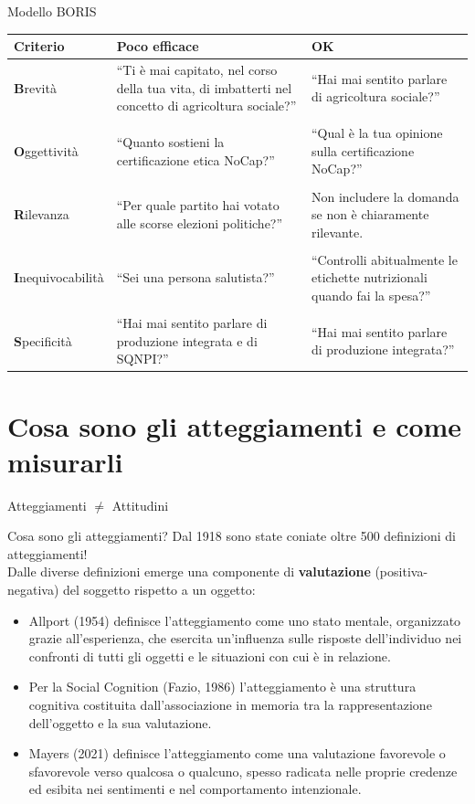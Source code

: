 \documentclass{beamer}
\begin{document}
\begin{frame}{Modello BORIS}
  \scriptsize
  \centering
  \begin{tabular}{lp{4cm}p{3.5cm}}
    \toprule
    \textbf{Criterio} & \textbf{Poco efficace} & \textbf{OK} \\
    \midrule
    \textbf{B}revità & “Ti è mai capitato, nel corso della tua vita, di imbatterti nel concetto di agricoltura sociale?” & “Hai mai sentito parlare di agricoltura sociale?” \\
    \\
    \textbf{O}ggettività & “Quanto sostieni la certificazione etica NoCap?” & “Qual è la tua opinione sulla certificazione NoCap?” \\
    \\
    \textbf{R}ilevanza & “Per quale partito hai votato alle scorse elezioni politiche?” & Non includere la domanda se non è chiaramente rilevante. \\
    \\
    \textbf{I}nequivocabilità & “Sei una persona salutista?” & “Controlli abitualmente le etichette nutrizionali quando fai la spesa?” \\
    \\
    \textbf{S}pecificità & “Hai mai sentito parlare di produzione integrata e di SQNPI?” & “Hai mai sentito parlare di produzione integrata?” \\
    \bottomrule
  \end{tabular}
\end{frame}

\section{Cosa sono gli atteggiamenti e come misurarli}
\begin{frame}{Atteggiamenti $\neq$ Attitudini}
    \begin{block}{Cosa sono gli atteggiamenti?}
        Dal 1918 sono state coniate oltre 500 definizioni di atteggiamenti! \\
        Dalle diverse definizioni emerge una componente di \textbf{valutazione} (positiva-negativa) del soggetto rispetto a un oggetto: \\
        \pause
        \small
    \begin{itemize}
        \item Allport (1954) definisce l’atteggiamento come uno stato mentale, organizzato grazie all’esperienza, che esercita un’influenza sulle risposte dell’individuo nei confronti di tutti gli oggetti e le situazioni con cui è in relazione.
        \item Per la Social Cognition (Fazio, 1986) l’atteggiamento è una struttura cognitiva costituita dall’associazione in memoria tra la rappresentazione dell’oggetto e la sua valutazione.
        \item Mayers (2021) definisce l’atteggiamento come una valutazione favorevole o sfavorevole verso qualcosa o qualcuno, spesso radicata nelle proprie credenze ed esibita nei sentimenti e nel comportamento intenzionale.
    \end{itemize}
    \end{block}
\end{frame}
\end{document}

